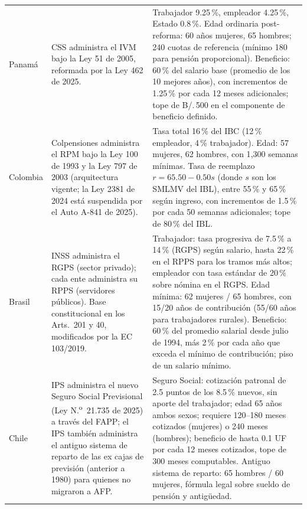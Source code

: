 \documentclass[12pt, letterpaper]{article}
\begin{document}
\begin{xltabular}{\textwidth}{P{1.6cm}Y Y}
Panamá &
CSS administra el IVM bajo la Ley 51 de 2005, reformada por la Ley 462 de 2025. &
Trabajador 9.25\,\%, empleador 4.25\,\%, Estado 0.8\,\%. Edad ordinaria post-reforma: 60 años mujeres, 65 hombres; 240 cuotas de referencia (mínimo 180 para pensión proporcional). Beneficio: 60\,\% del salario base (promedio de los 10 mejores años), con incrementos de 1.25\,\% por cada 12 meses adicionales; tope de B/.\,500 en el componente de beneficio definido. \\

Colombia &
Colpensiones administra el RPM bajo la Ley 100 de 1993 y la Ley 797 de 2003 (arquitectura vigente; la Ley 2381 de 2024 está suspendida por el Auto A-841 de 2025). &
Tasa total 16\,\% del IBC (12\,\% empleador, 4\,\% trabajador). Edad: 57 mujeres, 62 hombres, con 1{,}300 semanas mínimas. Tasa de reemplazo $r = 65.50 - 0.50s$ (donde $s$ son los SMLMV del IBL), entre 55\,\% y 65\,\% según ingreso, con incrementos de 1.5\,\% por cada 50 semanas adicionales; tope de 80\,\% del IBL. \\

Brasil &
INSS administra el RGPS (sector privado); cada ente administra su RPPS (servidores públicos). Base constitucional en los Arts.\ 201 y 40, modificados por la EC 103/2019. &
Trabajador: tasa progresiva de 7.5\,\% a 14\,\% (RGPS) según salario, hasta 22\,\% en el RPPS para los tramos más altos; empleador con tasa estándar de 20\,\% sobre nómina en el RGPS. Edad mínima: 62 mujeres / 65 hombres, con 15/20 años de contribución (55/60 años para trabajadores rurales). Beneficio: 60\,\% del promedio salarial desde julio de 1994, más 2\,\% por cada año que exceda el mínimo de contribución; piso de un salario mínimo. \\

Chile &
IPS administra el nuevo Seguro Social Previsional (Ley N.\textsuperscript{o}~21.735 de 2025) a través del FAPP; el IPS también administra el antiguo sistema de reparto de las ex cajas de previsión (anterior a 1980) para quienes no migraron a AFP. &
Seguro Social: cotización patronal de 2.5 puntos de los 8.5\,\% nuevos, sin aporte del trabajador; edad 65 años ambos sexos; requiere 120--180 meses cotizados (mujeres) o 240 meses (hombres); beneficio de hasta 0.1 UF por cada 12 meses cotizados, tope de 300 meses computables. Antiguo sistema de reparto: 65 hombres / 60 mujeres, fórmula legal sobre sueldo de pensión y antigüedad. \\

\end{xltabular}
\end{document}

